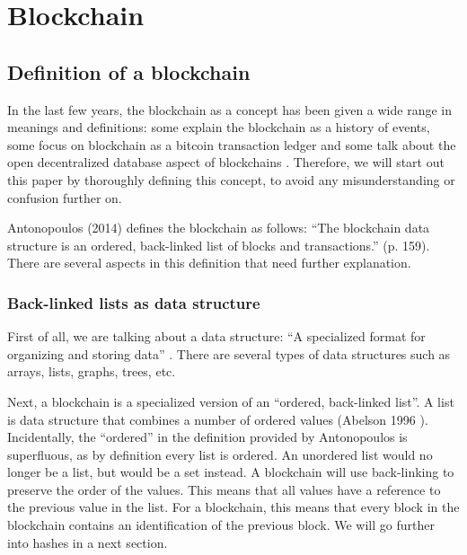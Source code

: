 \section{Blockchain}

\subsection{Definition of a blockchain}

\iffalse
todo: 
- different interpretations of blockchain
- reread and remove weird references
\fi

In the last few years, the blockchain as a concept has been given a wide range in meanings and definitions: some explain the blockchain as a history of events, some focus on blockchain as a bitcoin transaction ledger and some talk about the open decentralized database aspect of blockchains \cite{blockchain-multiple-definitions}. Therefore, we will start out this paper by thoroughly defining this concept, to avoid any misunderstanding or confusion further on.

Antonopoulos (2014) \cite{antonopoulos:2014} defines the blockchain as follows: ``The blockchain data structure is an ordered, back-linked list of blocks and transactions.'' (p. 159). There are several aspects in this definition that need further explanation.

\subsubsection{Back-linked lists as data structure}

First of all, we are talking about a data structure: ``A specialized format for organizing and storing data'' \cite{data-structure}. There are several types of data structures such as arrays, lists, graphs, trees, etc.

Next, a blockchain is a specialized version of an ``ordered, back-linked list''. A list is data structure that combines a number of ordered values (Abelson 1996 \cite{abelson:1996}).  Incidentally, the ``ordered'' in the definition provided by Antonopoulos is superfluous, as by definition every list is ordered. An unordered list would no longer be a list, but would be a set instead. A blockchain will use back-linking to preserve the order of the values. This means that all values have a reference to the previous value in the list. For a blockchain, this means that every block in the blockchain contains an identification of the previous block. We will go further into hashes in a next section.


